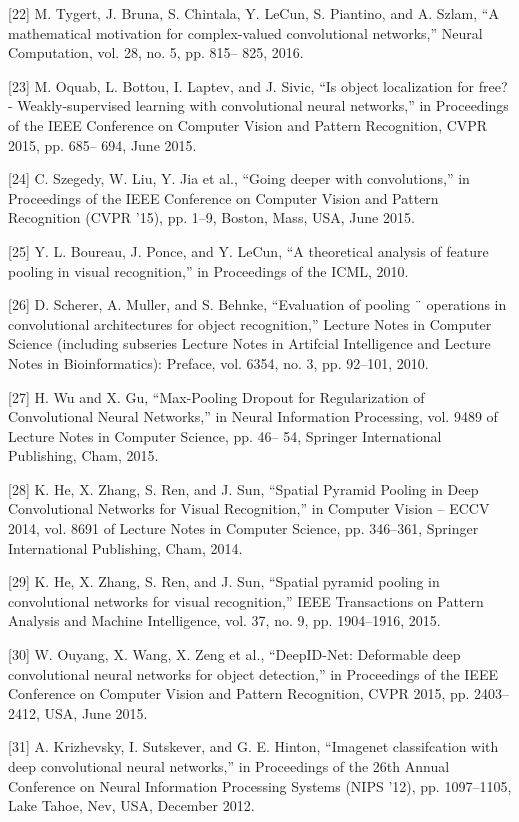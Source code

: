 \documentclass[a4paper]{article}
\begin{document}
[22] M. Tygert, J. Bruna, S. Chintala, Y. LeCun, S. Piantino, and A.
Szlam, “A mathematical motivation for complex-valued convolutional networks,” Neural Computation, vol. 28, no. 5, pp. 815–
825, 2016.


[23] M. Oquab, L. Bottou, I. Laptev, and J. Sivic, “Is object localization for free? - Weakly-supervised learning with convolutional
neural networks,” in Proceedings of the IEEE Conference on
Computer Vision and Pattern Recognition, CVPR 2015, pp. 685–
694, June 2015.


[24] C. Szegedy, W. Liu, Y. Jia et al., “Going deeper with convolutions,” in Proceedings of the IEEE Conference on Computer Vision
and Pattern Recognition (CVPR ’15), pp. 1–9, Boston, Mass, USA,
June 2015.


[25] Y. L. Boureau, J. Ponce, and Y. LeCun, “A theoretical analysis
of feature pooling in visual recognition,” in Proceedings of the
ICML, 2010.


[26] D. Scherer, A. Muller, and S. Behnke, “Evaluation of pooling ¨
operations in convolutional architectures for object recognition,” Lecture Notes in Computer Science (including subseries
Lecture Notes in Artifcial Intelligence and Lecture Notes in
Bioinformatics): Preface, vol. 6354, no. 3, pp. 92–101, 2010.


[27] H. Wu and X. Gu, “Max-Pooling Dropout for Regularization of
Convolutional Neural Networks,” in Neural Information Processing, vol. 9489 of Lecture Notes in Computer Science, pp. 46–
54, Springer International Publishing, Cham, 2015.


[28] K. He, X. Zhang, S. Ren, and J. Sun, “Spatial Pyramid Pooling in
Deep Convolutional Networks for Visual Recognition,” in Computer Vision – ECCV 2014, vol. 8691 of Lecture Notes in Computer
Science, pp. 346–361, Springer International Publishing, Cham,
2014.


[29] K. He, X. Zhang, S. Ren, and J. Sun, “Spatial pyramid pooling in
convolutional networks for visual recognition,” IEEE Transactions on Pattern Analysis and Machine Intelligence, vol. 37, no. 9,
pp. 1904–1916, 2015.


[30] W. Ouyang, X. Wang, X. Zeng et al., “DeepID-Net: Deformable
deep convolutional neural networks for object detection,” in
Proceedings of the IEEE Conference on Computer Vision and
Pattern Recognition, CVPR 2015, pp. 2403–2412, USA, June 2015.


[31] A. Krizhevsky, I. Sutskever, and G. E. Hinton, “Imagenet classifcation with deep convolutional neural networks,” in Proceedings
of the 26th Annual Conference on Neural Information Processing
Systems (NIPS ’12), pp. 1097–1105, Lake Tahoe, Nev, USA,
December 2012.
\end{document}
